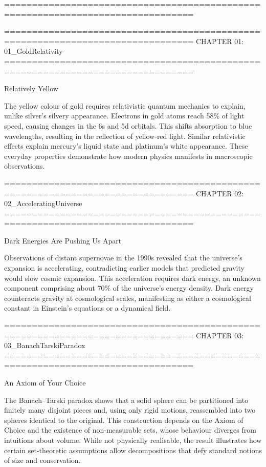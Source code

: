 
================================================================================


================================================================================
CHAPTER 01: 01_GoldRelativity
================================================================================

Relatively Yellow

The yellow colour of gold requires relativistic quantum mechanics to explain, unlike silver's silvery appearance. Electrons in gold atoms reach 58\% of light speed, causing changes in the 6s and 5d orbitals. This shifts absorption to blue wavelengths, resulting in the reflection of yellow-red light. Similar relativistic effects explain mercury's liquid state and platinum's white appearance. These everyday properties demonstrate how modern physics manifests in macroscopic observations.


================================================================================
CHAPTER 02: 02_AcceleratingUniverse
================================================================================

Dark Energies Are Pushing Us Apart

Observations of distant supernovae in the 1990s revealed that the universe's expansion is accelerating, contradicting earlier models that predicted gravity would slow cosmic expansion. This acceleration requires dark energy, an unknown component comprising about 70\% of the universe's energy density. Dark energy counteracts gravity at cosmological scales, manifesting as either a cosmological constant in Einstein's equations or a dynamical field.


================================================================================
CHAPTER 03: 03_BanachTarskiParadox
================================================================================

An Axiom of Your Choice

The Banach–Tarski paradox shows that a solid sphere can be partitioned into finitely many disjoint pieces and, using only rigid motions, reassembled into two spheres identical to the original. This construction depends on the Axiom of Choice and the existence of non-measurable sets, whose behaviour diverges from intuitions about volume. While not physically realisable, the result illustrates how certain set-theoretic assumptions allow decompositions that defy standard notions of size and conservation.


